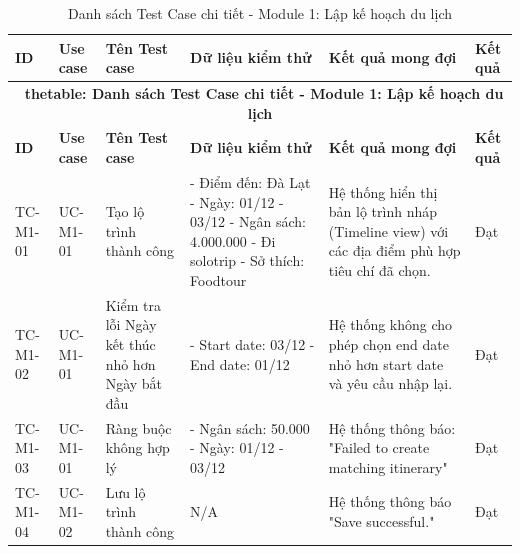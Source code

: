 \hypertarget{target:tc_m1}{}
\begin{landscape}
\small 
\begin{longtable}{|p{2.2cm}|p{2.2cm}|p{4cm}|p{4.5cm}|p{6cm}|p{2cm}|}
    
\caption{Danh sách Test Case chi tiết - Module 1: Lập kế hoạch du lịch} \label{tab:tc_module1} \\
\hline
\textbf{ID} & \textbf{ Use case} & \textbf{Tên Test case} & \textbf{Dữ liệu kiểm thử} & \textbf{Kết quả mong đợi} & \textbf{Kết quả } \\
\hline
\endfirsthead

\multicolumn{6}{c}{{\bfseries \tablename\ thetable{}: Danh sách Test Case chi tiết - Module 1: Lập kế hoạch du lịch}} \\
\hline
\textbf{ID} & \textbf{ Use case} & \textbf{Tên Test case} & \textbf{Dữ liệu kiểm thử} & \textbf{Kết quả mong đợi} & \textbf{Kết quả } \\
\hline
\endhead

\hline
\endlastfoot


TC-M1-01 & UC-M1-01 & Tạo lộ trình thành công & 
- Điểm đến: Đà Lạt \newline 
- Ngày: 01/12 - 03/12 \newline 
- Ngân sách: 4.000.000 \newline 
- Đi solotrip \newline
- Sở thích: Foodtour & 
Hệ thống hiển thị bản lộ trình nháp (Timeline view) với các địa điểm phù hợp tiêu chí đã chọn. & Đạt\\
\hline

TC-M1-02 & UC-M1-01 & Kiểm tra lỗi Ngày kết thúc nhỏ hơn Ngày bắt đầu & 
- Start date: 03/12 \newline
- End date: 01/12 & 
Hệ thống không cho phép chọn end date nhỏ hơn start date và yêu cầu nhập lại. & Đạt \\
\hline

TC-M1-03 & UC-M1-01 & Ràng buộc không hợp lý & 
- Ngân sách: 50.000 \newline
- Ngày: 01/12 - 03/12 & 
Hệ thống thông báo: "Failed to create matching itinerary" & Đạt\\
\hline

TC-M1-04 & UC-M1-02 & Lưu lộ trình thành công & 
N/A & 
Hệ thống thông báo "Save successful." & Đạt \\
\hline


\end{longtable}
\end{landscape}
